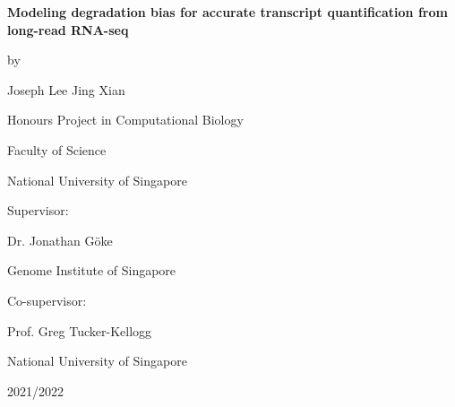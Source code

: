 
\begin{titlepage}
   \begin{center}
       \vspace*{1cm}
       
       \Large
       \textbf{Modeling degradation bias for accurate transcript quantification from long-read RNA-seq}
       
       \vspace{1.5cm}
       
       \large
       by\\
       
       \vspace{0.25cm}
       
       Joseph Lee Jing Xian
       
       \vspace{1.5cm}
       
       Honours Project in Computational Biology
       
       \vspace{0.25cm}
       
       Faculty of Science
       
       \vspace{0.25cm}
       
       National University of Singapore
       
       \vspace{1.5cm}
       
       Supervisor:
       
       \vspace{0.25cm}
       
       Dr. Jonathan Göke
       
       \vspace{0.25cm}
       
       Genome Institute of Singapore
       
       \vspace{1.5cm}
       
       Co-supervisor:
       
       \vspace{0.25cm}
       
       Prof. Greg Tucker-Kellogg
       
       \vspace{0.25cm}
       
       National University of Singapore
       
       \vfill
       
       2021/2022

   \end{center}
\end{titlepage}
